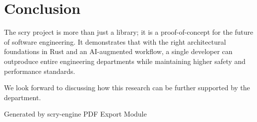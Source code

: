 \documentclass[11pt,a4paper]{article}
\begin{document}
\section{Conclusion}

The scry project is more than just a library; it is a proof-of-concept for the future of software engineering. It demonstrates that with the right architectural foundations in Rust and an AI-augmented workflow, a single developer can outproduce entire engineering departments while maintaining higher safety and performance standards.

We look forward to discussing how this research can be further supported by the department.

\vfill
\begin{center}
\textcolor{mutedgray}{\small Generated by scry-engine PDF Export Module}
\end{center}
\end{document}
